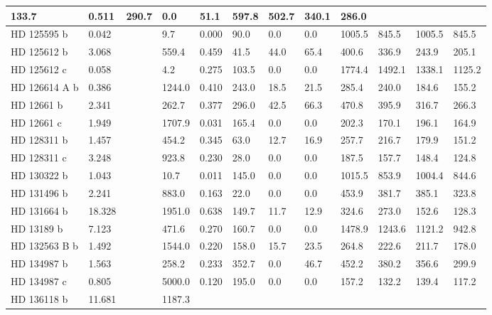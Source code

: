 \documentclass[letterpaper,10pt,english]{sphinxmanual}
\begin{document}
\begin{longtable}{|l|l|l|l|l|l|l|l|l|l|l|l|}
133.7
 & 
0.511
 & 
290.7
 & 
0.0
 & 
51.1
 & 
597.8
 & 
502.7
 & 
340.1
 & 
286.0
\\
\hline
HD 125595 b
 & 
0.042
 &  & 
9.7
 & 
0.000
 & 
90.0
 & 
0.0
 & 
0.0
 & 
1005.5
 & 
845.5
 & 
1005.5
 & 
845.5
\\
\hline
HD 125612 b
 & 
3.068
 &  & 
559.4
 & 
0.459
 & 
41.5
 & 
44.0
 & 
65.4
 & 
400.6
 & 
336.9
 & 
243.9
 & 
205.1
\\
\hline
HD 125612 c
 & 
0.058
 &  & 
4.2
 & 
0.275
 & 
103.5
 & 
0.0
 & 
0.0
 & 
1774.4
 & 
1492.1
 & 
1338.1
 & 
1125.2
\\
\hline
HD 126614 A b
 & 
0.386
 &  & 
1244.0
 & 
0.410
 & 
243.0
 & 
18.5
 & 
21.5
 & 
285.4
 & 
240.0
 & 
184.6
 & 
155.2
\\
\hline
HD 12661 b
 & 
2.341
 &  & 
262.7
 & 
0.377
 & 
296.0
 & 
42.5
 & 
66.3
 & 
470.8
 & 
395.9
 & 
316.7
 & 
266.3
\\
\hline
HD 12661 c
 & 
1.949
 &  & 
1707.9
 & 
0.031
 & 
165.4
 & 
0.0
 & 
0.0
 & 
202.3
 & 
170.1
 & 
196.1
 & 
164.9
\\
\hline
HD 128311 b
 & 
1.457
 &  & 
454.2
 & 
0.345
 & 
63.0
 & 
12.7
 & 
16.9
 & 
257.7
 & 
216.7
 & 
179.9
 & 
151.2
\\
\hline
HD 128311 c
 & 
3.248
 &  & 
923.8
 & 
0.230
 & 
28.0
 & 
0.0
 & 
0.0
 & 
187.5
 & 
157.7
 & 
148.4
 & 
124.8
\\
\hline
HD 130322 b
 & 
1.043
 &  & 
10.7
 & 
0.011
 & 
145.0
 & 
0.0
 & 
0.0
 & 
1015.5
 & 
853.9
 & 
1004.4
 & 
844.6
\\
\hline
HD 131496 b
 & 
2.241
 &  & 
883.0
 & 
0.163
 & 
22.0
 & 
0.0
 & 
0.0
 & 
453.9
 & 
381.7
 & 
385.1
 & 
323.8
\\
\hline
HD 131664 b
 & 
18.328
 &  & 
1951.0
 & 
0.638
 & 
149.7
 & 
11.7
 & 
12.9
 & 
324.6
 & 
273.0
 & 
152.6
 & 
128.3
\\
\hline
HD 13189 b
 & 
7.123
 &  & 
471.6
 & 
0.270
 & 
160.7
 & 
0.0
 & 
0.0
 & 
1478.9
 & 
1243.6
 & 
1121.2
 & 
942.8
\\
\hline
HD 132563 B b
 & 
1.492
 &  & 
1544.0
 & 
0.220
 & 
158.0
 & 
15.7
 & 
23.5
 & 
264.8
 & 
222.6
 & 
211.7
 & 
178.0
\\
\hline
HD 134987 b
 & 
1.563
 &  & 
258.2
 & 
0.233
 & 
352.7
 & 
0.0
 & 
46.7
 & 
452.2
 & 
380.2
 & 
356.6
 & 
299.9
\\
\hline
HD 134987 c
 & 
0.805
 &  & 
5000.0
 & 
0.120
 & 
195.0
 & 
0.0
 & 
0.0
 & 
157.2
 & 
132.2
 & 
139.4
 & 
117.2
\\
\hline
HD 136118 b
 & 
11.681
 &  & 
1187.3

\end{longtable}
\end{document}
